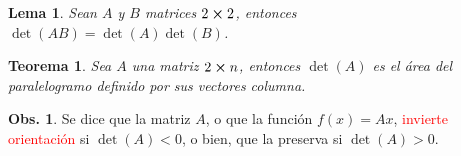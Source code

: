 \documentclass{article}
\theoremstyle{definicion}
\theoremstyle{definition}             %
\theoremstyle{definition}             %
\theoremstyle{definition}
\theoremstyle{definition}
\theoremstyle{observacion}
\newtheorem{obs}{Obs.}
\theoremstyle{definition}
\theoremstyle{plain}
\newtheorem{lemma}{Lema}
\newtheorem{theorem}{Teorema}
\theoremstyle{definition}
\theoremstyle{afirmacion}
\theoremstyle{notation}
\theoremstyle{definition}
\begin{document}
    \begin{lemma}
        Sean \(A\) y \(B\) matrices \(2 \cross 2\), entonces \(\det(AB) = \det(A)\det(B)\).
    \end{lemma}

    \begin{theorem}
        Sea \(A\) una matriz \(2 \cross n\), entonces \(\det(A)\) es el área del paralelogramo definido por sus vectores columna.
    \end{theorem}

    \begin{obs}
        Se dice que la matriz \(A\), o que la función \(f(x) = Ax\), \textcolor{red}{invierte orientación} si \(\det(A) < 0\), o bien, que la preserva si \(\det(A) > 0\).
    \end{obs}
\end{document}
